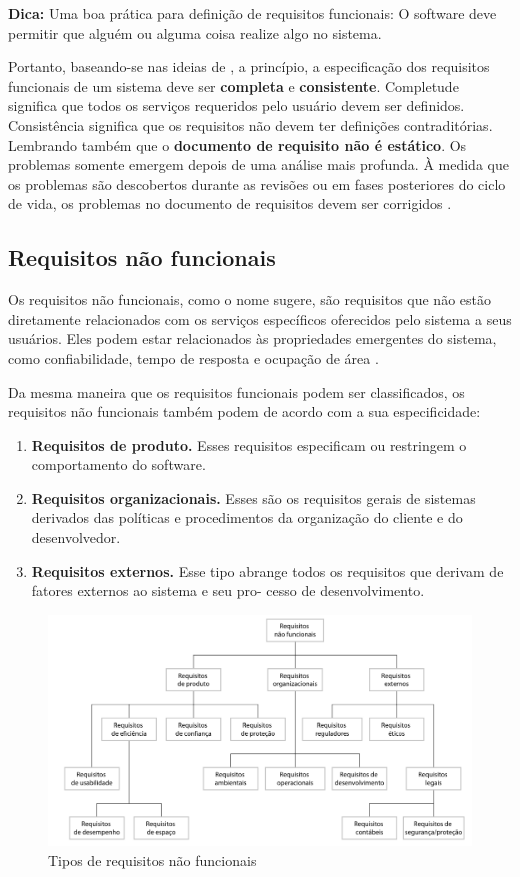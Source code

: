 \textbf{Dica:}
Uma boa prática para definição de requisitos funcionais: O software deve permitir que alguém ou alguma coisa realize algo no sistema.

Portanto, baseando-se nas ideias de , a princípio, a especificação dos requisitos funcionais de um sistema deve ser \textbf{completa} e \textbf{consistente}. Completude significa que todos os serviços requeridos pelo usuário devem ser definidos. Consistência significa que os requisitos não devem ter definições contraditórias. Lembrando também que o \textbf{documento de requisito não é estático}. Os problemas somente emergem depois de uma análise mais profunda. À medida que os problemas são descobertos durante as revisões ou em fases posteriores do ciclo de vida, os problemas no documento de requisitos devem ser corrigidos \cite{sommerville2003engenharia}.

\subsection{Requisitos não funcionais}

Os requisitos não funcionais, como o nome sugere, são requisitos que não estão diretamente relacionados com os serviços específicos oferecidos pelo sistema a seus usuários. Eles podem estar relacionados às propriedades emergentes do sistema, como confiabilidade, tempo de resposta e ocupação de área \cite{sommerville2016software}. 

Da mesma maneira que os requisitos funcionais podem ser classificados, os requisitos não funcionais também podem de acordo com a sua especificidade: 

\begin{enumerate}
	\item \textbf{Requisitos de produto.} Esses requisitos especificam ou restringem o comportamento do software.
	\item \textbf{Requisitos organizacionais.} Esses são os requisitos gerais de sistemas derivados das políticas e procedimentos da organização do cliente e do desenvolvedor.
	\item \textbf{ Requisitos externos.} Esse tipo abrange todos os requisitos que derivam de fatores externos ao sistema e seu pro- cesso de desenvolvimento.
\end{enumerate}

\begin{figure}[H]
	\centering
	\includegraphics[scale=0.4]{imagens/req-n-funcionais.png}
	\caption{Tipos de requisitos não funcionais \cite{sommerville2016software}}
	\label{fig:tipos-requisitos-nao-funcionais}
\end{figure}

 
